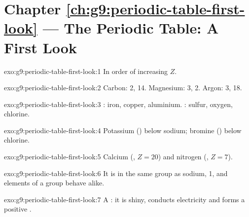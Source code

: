 \section*{Chapter \ref{ch:g9:periodic-table-first-look} --- The Periodic Table: A First Look}

\begin{solution}{exo:g9:periodic-table-first-look:1}
In order of increasing  $Z$.
\end{solution}

\begin{solution}{exo:g9:periodic-table-first-look:2}
Carbon:  2,  14. Magnesium:  3,  2. Argon:
 3,  18.
\end{solution}

\begin{solution}{exo:g9:periodic-table-first-look:3}
: iron, copper, aluminium. : sulfur, oxygen, chlorine.
\end{solution}

\begin{solution}{exo:g9:periodic-table-first-look:4}
Potassium () below sodium; bromine () below chlorine.
\end{solution}

\begin{solution}{exo:g9:periodic-table-first-look:5}
Calcium (, $Z = 20$) and nitrogen (, $Z = 7$).
\end{solution}

\begin{solution}{exo:g9:periodic-table-first-look:6}
It is in the same group as sodium,  1, and elements of a group
behave alike.
\end{solution}

\begin{solution}{exo:g9:periodic-table-first-look:7}
A : it is shiny, conducts electricity and forms a positive .
\end{solution}

